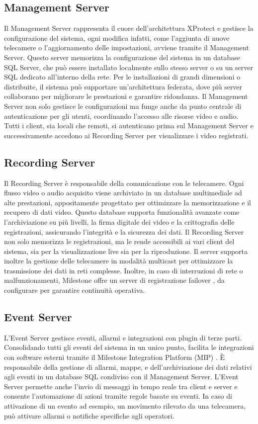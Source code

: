 \documentclass[a4paper, openright, thesis]{report}
\begin{document}
\subsection{Management Server}
Il Management Server rappresenta il cuore dell'architettura XProtect e gestisce la configurazione del sistema, ogni modifica infatti, come l'aggiunta di nuove telecamere o l'aggiornamento delle impostazioni, avviene tramite il Management Server. Questo server memorizza la configurazione del sistema in un database SQL Server, che può essere installato localmente sullo stesso server o su un server SQL dedicato all'interno della rete. Per le installazioni di grandi dimensioni o distribuite, il sistema può supportare un'architettura federata, dove più server collaborano per migliorare le prestazioni e garantire ridondanza.
Il Management Server non solo gestisce le configurazioni ma funge anche da punto centrale di autenticazione per gli utenti, coordinando l'accesso alle risorse video e audio. Tutti i client, sia locali che remoti, si autenticano prima sul Management Server e successivamente accedono ai Recording Server per visualizzare i video registrati.

\subsection{Recording Server}
Il Recording Server è responsabile della comunicazione con le telecamere. Ogni flusso video o audio acquisito viene archiviato in un database multimediale ad alte prestazioni, appositamente progettato per ottimizzare la memorizzazione e il recupero di dati video. Questo database supporta funzionalità avanzate come l'archiviazione su più livelli, la firma digitale dei video e la crittografia delle registrazioni, assicurando l'integrità e la sicurezza dei dati.
Il Recording Server non solo memorizza le registrazioni, ma le rende accessibili ai vari client del sistema, sia per la visualizzazione live sia per la riproduzione. Il server supporta inoltre la gestione delle telecamere in modalità multicast per ottimizzare la trasmissione dei dati in reti complesse. Inoltre, in caso di interruzioni di rete o malfunzionamenti, Milestone offre un server di registrazione failover \cite{failover}, da configurare per garantire continuità operativa.

\subsection{Event Server}
L’Event Server gestisce eventi, allarmi e integrazioni con plugin di terze parti. Consolidando tutti gli eventi del sistema in un unico punto, facilita le integrazioni con software esterni tramite il Milestone Integration Platform (MIP) \cite{mipdoc}. È responsabile della gestione di allarmi, mappe, e dell'archiviazione dei dati relativi agli eventi in un database SQL condiviso con il Management Server.
L'Event Server permette anche l'invio di messaggi in tempo reale tra client e server e consente l'automazione di azioni tramite regole basate su eventi. In caso di attivazione di un evento ad esempio, un movimento rilevato da una telecamera,  può attivare allarmi o notifiche specifiche agli operatori.
\end{document}

